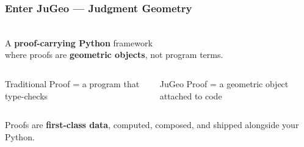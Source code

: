 \begin{frame}
\frametitle{Enter JuGeo --- Judgment Geometry}
\begin{center}
\vspace{0.3cm}
{\LARGE {}}\\[0.5cm]
{\large A \textbf{proof-carrying Python} framework\\[4pt]
where proofs are \textcolor{jugeoGreen}{\textbf{geometric objects}}, not program terms.}
\end{center}
\vfill
\begin{columns}[T]
\begin{block}{Traditional}
  Proof = a program that type-checks
\end{block}
\begin{exampleblock}{JuGeo}
  Proof = a geometric object attached to code
\end{exampleblock}
\end{columns}
\vfill
\begin{center}
\small Proofs are \textbf{first-class data}, computed, composed, and shipped alongside your Python.
\end{center}
\end{frame}


